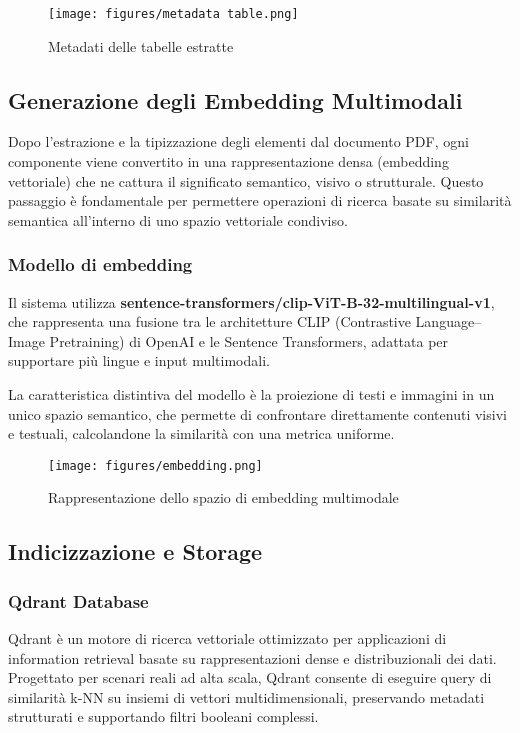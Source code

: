 \documentclass[12pt,a4paper]{article}
\begin{document}
\begin{figure}[!ht]
\centering
\texttt{[image: figures/metadata table.png]}
\caption{Metadati delle tabelle estratte}
\label{fig:table_metadata}
\end{figure}

\subsection{Generazione degli Embedding Multimodali}
Dopo l'estrazione e la tipizzazione degli elementi dal documento PDF, ogni componente viene convertito in una rappresentazione densa (embedding vettoriale) che ne cattura il significato semantico, visivo o strutturale. Questo passaggio è fondamentale per permettere operazioni di ricerca basate su similarità semantica all'interno di uno spazio vettoriale condiviso.

\subsubsection{Modello di embedding}
Il sistema utilizza \textbf{sentence-transformers/clip-ViT-B-32-multilingual-v1}, che rappresenta una fusione tra le architetture CLIP (Contrastive Language–Image Pretraining) di OpenAI e le Sentence Transformers, adattata per supportare più lingue e input multimodali.

La caratteristica distintiva del modello è la proiezione di testi e immagini in un unico spazio semantico, che permette di confrontare direttamente contenuti visivi e testuali, calcolandone la similarità con una metrica uniforme.

\begin{figure}[!ht]
\centering
\texttt{[image: figures/embedding.png]}
\caption{Rappresentazione dello spazio di embedding multimodale}
\label{fig:embedding_space}
\end{figure}

\subsection{Indicizzazione e Storage}

\subsubsection{Qdrant Database}
Qdrant è un motore di ricerca vettoriale ottimizzato per applicazioni di information retrieval basate su rappresentazioni dense e distribuzionali dei dati. Progettato per scenari reali ad alta scala, Qdrant consente di eseguire query di similarità k-NN su insiemi di vettori multidimensionali, preservando metadati strutturati e supportando filtri booleani complessi.
\end{document}
